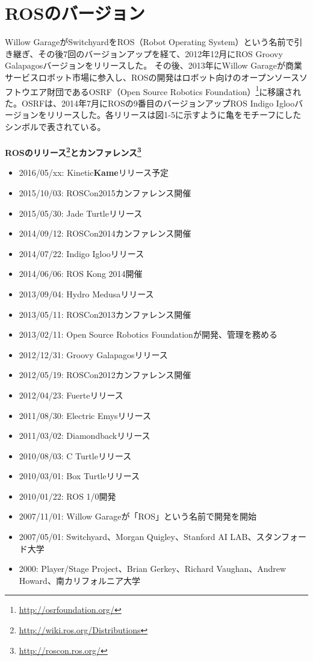 \section{ROSのバージョン}

Willow GarageがSwitchyardをROS（Robot Operating System）という名前で引き継ぎ、その後7回のバージョンアップを経て、2012年12月にROS Groovy Galapagosバージョンをリリースした。
その後、2013年にWillow Garageが商業サービスロボット市場に参入し、ROSの開発はロボット向けのオープンソースソフトウエア財団であるOSRF（Open Source Robotics Foundation）\footnote{\url{http://osrfoundation.org/}}に移譲された。OSRFは、2014年7月にROSの9番目のバージョンアップROS Indigo Iglooバージョンをリリースした。各リリースは図1-5に示すように亀をモチーフにしたシンボルで表されている。
\\\\
\textbf{ROSのリリース\footnote{\url{http://wiki.ros.org/Distributions}}とカンファレンス\footnote{\url{http://roscon.ros.org/}}}
\begin{itemize}[leftmargin=*]
\item  2016/05/xx: Kinetic\textbf{Kame}リリース予定
\item  2015/10/03: ROSCon2015カンファレンス開催
\item  2015/05/30: Jade Turtleリリース
\item  2014/09/12: ROSCon2014カンファレンス開催
\item  2014/07/22: Indigo Iglooリリース
\item  2014/06/06: ROS Kong 2014開催
\item  2013/09/04: Hydro Medusaリリース
\item  2013/05/11: ROSCon2013カンファレンス開催
\item  2013/02/11: Open Source Robotics Foundationが開発、管理を務める
\item  2012/12/31: Groovy Galapagosリリース
\item  2012/05/19: ROSCon2012カンファレンス開催
\item  2012/04/23: Fuerteリリース
\item  2011/08/30: Electric Emysリリース
\item  2011/03/02: Diamondbackリリース
\item  2010/08/03: C Turtleリリース
\item  2010/03/01: Box Turtleリリース
\item  2010/01/22: ROS 1/0開発
\item  2007/11/01: Willow Garageが「ROS」という名前で開発を開始
\item  2007/05/01: Switchyard、Morgan Quigley、Stanford AI LAB、スタンフォード大学
\item  2000: Player/Stage Project、Brian Gerkey、Richard Vaughan、Andrew Howard、南カリフォルニア大学
\end{itemize}


